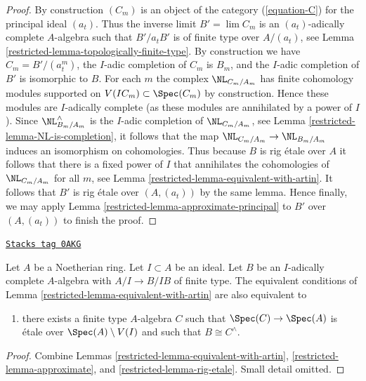 \begin{proof}
\medskip\noindent
By construction $(C_m)$ is an object of the category
(\ref{equation-C}) for the principal ideal $(a_t)$.
Thus the inverse limit $B' = \lim C_m$ is an $(a_t)$-adically
complete $A$-algebra such that $B'/a_t B'$ is of finite type
over $A/(a_t)$, see Lemma \ref{restricted-lemma-topologically-finite-type}.
By construction we have $C_m = B'/(a_t^m)$, the $I$-adic
completion of $C_m$ is $B_m$, and the $I$-adic completion of
$B'$ is isomorphic to $B$.
For each $m$ the complex $\NL_{C_m/A_m}$ has finite cohomology
modules supported on $V(IC_m) \subset \Spec(C_m)$ by construction.
Hence these modules are $I$-adically complete (as these modules
are annihilated by a power of $I$). Since $\NL^\wedge_{B_m/A_m}$
is the $I$-adic completion of $\NL_{C_m/A_m}$, see
Lemma \ref{restricted-lemma-NL-is-completion}, it
follows that the map $\NL_{C_m/A_m} \to \NL_{B_m/A_m}$ induces
an isomorphism on cohomologies. Thus because $B$ is rig \'etale
over $A$ it follows that there is a fixed power of $I$ that annihilates
the cohomologies of $\NL_{C_m/A_m}$ for all $m$, see
Lemma \ref{restricted-lemma-equivalent-with-artin}. It follows that $B'$
is rig \'etale over $(A, (a_t))$ by the same lemma.
Hence finally, we may apply Lemma \ref{restricted-lemma-approximate-principal}
to $B'$ over $(A, (a_t))$ to finish the proof.
\end{proof}

\begin{lemma}
\label{restricted-lemma-approximate-by-etale-over-complement}
\href{https://stacks.math.columbia.edu/tag/0AKG}{\texttt{Stacks tag 0AKG}}

Let $A$ be a Noetherian ring. Let $I \subset A$ be an ideal.
Let $B$ be an $I$-adically complete $A$-algebra with $A/I \to B/IB$
of finite type. The equivalent conditions of
Lemma \ref{restricted-lemma-equivalent-with-artin} are also equivalent to
\begin{enumerate}
\item[(8)]
\label{restricted-item-algebraize}
there exists a finite type $A$-algebra $C$ such that
$\Spec(C) \to \Spec(A)$ is \'etale over $\Spec(A) \setminus V(I)$
and such that $B \cong C^\wedge$.
\end{enumerate}
\end{lemma}

\begin{proof}

Combine Lemmas \ref{restricted-lemma-equivalent-with-artin}, \ref{restricted-lemma-approximate}, and
\ref{restricted-lemma-rig-etale}. Small detail omitted.
\end{proof}

